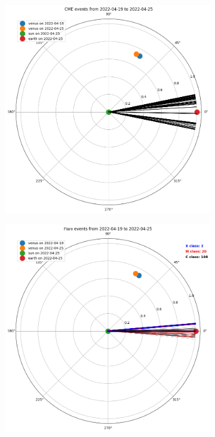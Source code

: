         \begin{figure}[H]
        \centering
        \begin{subfigure}{.47\textwidth}
            \includegraphics[width=\textwidth]{report/Figures/results/cme_loc.png}
        \end{subfigure}%
        \hspace{1em}
        \begin{subfigure}{.47\textwidth}
            \centering
            \includegraphics[width=\textwidth]{report/Figures/results/fl_loc.png}

\end{subfigure}
\end{figure}

